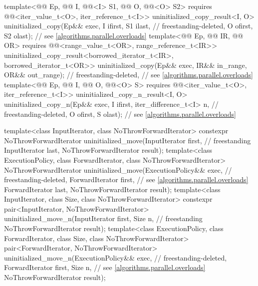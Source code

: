 \begin{codeblock}
{{    template<@@ Ep, @@ I, @@<I> S1,
             @@ O, @@<O> S2>
      requires @@<iter_value_t<O>, iter_reference_t<I>>
        uninitialized_copy_result<I, O>
          uninitialized_copy(Ep&& exec, I ifirst, S1 ilast,                 // freestanding-deleted,
                             O ofirst, S2 olast);                           // see \ref{algorithms.parallel.overloads}
    template<@@ Ep, @@ IR,
             @@ OR>
      requires @@<range_value_t<OR>, range_reference_t<IR>>
        uninitialized_copy_result<borrowed_iterator_t<IR>, borrowed_iterator_t<OR>>
          uninitialized_copy(Ep&& exec, IR&& in_range, OR&& out_range);     // freestanding-deleted,
                                                                            // see \ref{algorithms.parallel.overloads}
    template<@@ Ep, @@ I, @@ O,
             @@<O> S>
      requires @@<iter_value_t<O>, iter_reference_t<I>>
        uninitialized_copy_n_result<I, O>
          uninitialized_copy_n(Ep&& exec, I ifirst, iter_difference_t<I> n, // freestanding-deleted,
                               O ofirst, S olast);                          // see \ref{algorithms.parallel.overloads}
  }

  template<class InputIterator, class NoThrowForwardIterator>
    constexpr NoThrowForwardIterator uninitialized_move(InputIterator first,        // freestanding
                                                        InputIterator last,
                                                        NoThrowForwardIterator result);
  template<class ExecutionPolicy, class ForwardIterator, class NoThrowForwardIterator>
    NoThrowForwardIterator uninitialized_move(ExecutionPolicy&& exec,       // freestanding-deleted,
                                              ForwardIterator first,        // see \ref{algorithms.parallel.overloads}
                                              ForwardIterator last,
                                              NoThrowForwardIterator result);
  template<class InputIterator, class Size, class NoThrowForwardIterator>
    constexpr pair<InputIterator, NoThrowForwardIterator>
      uninitialized_move_n(InputIterator first, Size n,                             // freestanding
                           NoThrowForwardIterator result);
  template<class ExecutionPolicy, class ForwardIterator, class Size,
           class NoThrowForwardIterator>
    pair<ForwardIterator, NoThrowForwardIterator>
      uninitialized_move_n(ExecutionPolicy&& exec,                          // freestanding-deleted,
                           ForwardIterator first, Size n,                   // see \ref{algorithms.parallel.overloads}
                           NoThrowForwardIterator result);

}
\end{codeblock}
